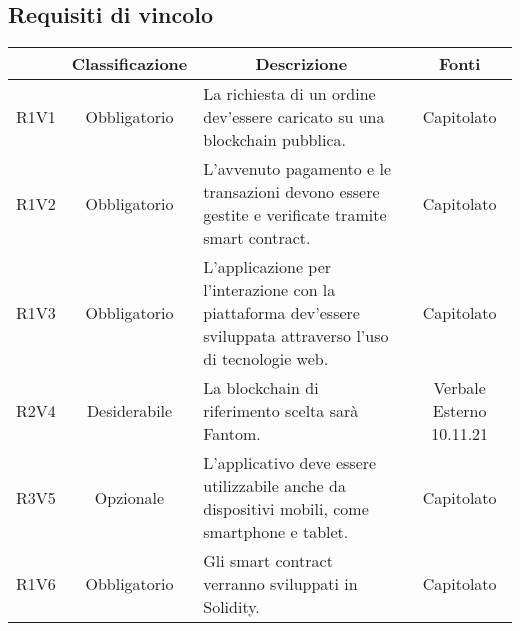 \subsection{Requisiti di vincolo} \label{subsection:requisiti_vincolo}
\begin{table}[H]
    \centering
    \renewcommand{\arraystretch}{1.8}
    \begin{tabular}{c | c | p{6cm} | c}
        \rowcolor[HTML]{125E28}
        \multicolumn{1}{c}{\color[HTML]{FFFFFF} \textbf{Codice}}          &
        \multicolumn{1}{c}{\color[HTML]{FFFFFF} \textbf{Classificazione}} &
        \multicolumn{1}{c}{\color[HTML]{FFFFFF} \textbf{Descrizione}}     &
        \multicolumn{1}{c}{\color[HTML]{FFFFFF} \textbf{Fonti}}                                                                                                                                                                     \\
        \hline
        R1V1                                                              & Obbligatorio & La richiesta di un ordine dev'essere caricato su una blockchain\glo{} pubblica.                               & Capitolato               \\
        R1V2                                                              & Obbligatorio & L'avvenuto pagamento e le transazioni devono essere gestite e verificate tramite smart contract\glo{}.        & Capitolato               \\
        R1V3                                                              & Obbligatorio & L'applicazione per l'interazione con la piattaforma dev'essere sviluppata attraverso l'uso di tecnologie web. & Capitolato               \\
        R2V4                                                              & Desiderabile & La blockchain\glo{} di riferimento scelta sarà Fantom\glo{}.                                                  & Verbale Esterno 10.11.21 \\
        R3V5                                                              & Opzionale    & L'applicativo deve essere utilizzabile anche da dispositivi mobili, come smartphone e tablet.                 & Capitolato               \\
        R1V6                                                              & Obbligatorio & Gli smart contract\glo{} verranno sviluppati in Solidity\glo{}.                                               & Capitolato               \\

\end{tabular}
\end{table}
